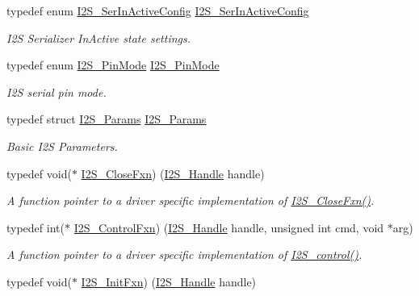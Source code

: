 \begin{DoxyCompactItemize}
typedef enum \hyperlink{_i2_s_8h_a59a8a15850cffe145050ee9f0958bcd3}{I2\+S\+\_\+\+Ser\+In\+Active\+Config} \hyperlink{_i2_s_8h_a19123e5e2c577320f90558cfc640e918}{I2\+S\+\_\+\+Ser\+In\+Active\+Config}
\begin{DoxyCompactList}\small\item\em I2\+S Serializer In\+Active state settings. \end{DoxyCompactList}\item 
typedef enum \hyperlink{_i2_s_8h_a68adf81f32430f87478afbc63e0623af}{I2\+S\+\_\+\+Pin\+Mode} \hyperlink{_i2_s_8h_ac3246d834f54bb71d4b58fe945cb9228}{I2\+S\+\_\+\+Pin\+Mode}
\begin{DoxyCompactList}\small\item\em I2\+S serial pin mode. \end{DoxyCompactList}\item 
typedef struct \hyperlink{struct_i2_s___params}{I2\+S\+\_\+\+Params} \hyperlink{_i2_s_8h_afff1198c952846b6248c11a68f5927ff}{I2\+S\+\_\+\+Params}
\begin{DoxyCompactList}\small\item\em Basic I2\+S Parameters. \end{DoxyCompactList}\item 
typedef void($\ast$ \hyperlink{_i2_s_8h_a91bfa91197cb8ff2388744088177dde8}{I2\+S\+\_\+\+Close\+Fxn}) (\hyperlink{_i2_s_8h_aff0fad1efd0d9dc3c8d2cc87e73cd5a0}{I2\+S\+\_\+\+Handle} handle)
\begin{DoxyCompactList}\small\item\em A function pointer to a driver specific implementation of \hyperlink{_i2_s_8h_a91bfa91197cb8ff2388744088177dde8}{I2\+S\+\_\+\+Close\+Fxn()}. \end{DoxyCompactList}\item 
typedef int($\ast$ \hyperlink{_i2_s_8h_aec416642887dbc181166c479a79c5615}{I2\+S\+\_\+\+Control\+Fxn}) (\hyperlink{_i2_s_8h_aff0fad1efd0d9dc3c8d2cc87e73cd5a0}{I2\+S\+\_\+\+Handle} handle, unsigned int cmd, void $\ast$arg)
\begin{DoxyCompactList}\small\item\em A function pointer to a driver specific implementation of \hyperlink{_i2_s_8h_a1af19b22e9036bee696b4e4efe4916b0}{I2\+S\+\_\+control()}. \end{DoxyCompactList}\item 
typedef void($\ast$ \hyperlink{_i2_s_8h_a17f21fcbc2627ef97044ee7ff6cfdee6}{I2\+S\+\_\+\+Init\+Fxn}) (\hyperlink{_i2_s_8h_aff0fad1efd0d9dc3c8d2cc87e73cd5a0}{I2\+S\+\_\+\+Handle} handle)

\end{DoxyCompactItemize}
